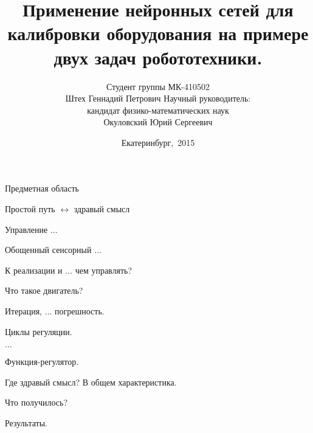 \documentclass[notes,compress]{beamer}
\title
      {{Применение нейронных сетей для калибровки оборудования на примере двух задач робототехники.}}
\author{Студент группы МК-410502 \\
 Штех Геннадий Петрович \newline
 \newline
Научный руководитель: \\
кандидат физико-математических наук \\
Окуловский Юрий Сергеевич \\}
\institute{Уральский федеральный университет}
\date{Екатеринбург,~2015}
\begin{document}

%
\frame{\titlepage}


 \LogoOff







\begin{frame}
    Предметная область
    
    Простой путь $\leftrightarrow$ здравый смысл
    
    Управление $\ldots$
    
    Обощенный сенсорный $\ldots$
    
    К реализации и $\ldots$ чем управлять?
\end{frame}

\begin{frame}
Что такое двигатель?

Итерация, $\ldots$ погрешность.

Циклы регуляции.

$\ldots$

Функция-регулятор.

Где здравый смысл? В общем характеристика.

\end{frame}



\begin{frame}

Что получилось?

Результаты.

\end{frame}
\end{document}
